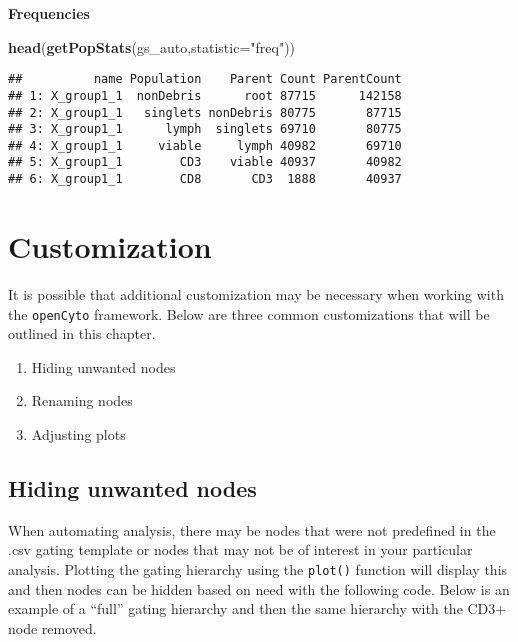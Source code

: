 \documentclass[]{book}
\newenvironment{Shaded}{\begin{snugshade}}{\end{snugshade}}
\newcommand{\DataTypeTok}[1]{\textcolor[rgb]{0.13,0.29,0.53}{#1}}
\newcommand{\KeywordTok}[1]{\textcolor[rgb]{0.13,0.29,0.53}{\textbf{#1}}}
\newcommand{\NormalTok}[1]{#1}
\newcommand{\StringTok}[1]{\textcolor[rgb]{0.31,0.60,0.02}{#1}}
\providecommand{\tightlist}{%
  \setlength{\itemsep}{0pt}\setlength{\parskip}{0pt}}
\begin{document}
\textbf{Frequencies}

\begin{Shaded}
\begin{Highlighting}[]
\KeywordTok{head}\NormalTok{(}\KeywordTok{getPopStats}\NormalTok{(gs_auto,}\DataTypeTok{statistic=}\StringTok{"freq"}\NormalTok{))}
\end{Highlighting}
\end{Shaded}

\begin{verbatim}
##          name Population    Parent Count ParentCount
## 1: X_group1_1  nonDebris      root 87715      142158
## 2: X_group1_1   singlets nonDebris 80775       87715
## 3: X_group1_1      lymph  singlets 69710       80775
## 4: X_group1_1     viable     lymph 40982       69710
## 5: X_group1_1        CD3    viable 40937       40982
## 6: X_group1_1        CD8       CD3  1888       40937
\end{verbatim}

\hypertarget{customization}{%
\chapter{Customization}\label{customization}}

It is possible that additional customization may be necessary when working with the \texttt{openCyto} framework. Below are three common customizations that will be outlined in this chapter.

\begin{enumerate}
\def\labelenumi{\arabic{enumi}.}
\tightlist
\item
  Hiding unwanted nodes
\item
  Renaming nodes
\item
  Adjusting plots
\end{enumerate}

\hypertarget{hiding-unwanted-nodes}{%
\section{Hiding unwanted nodes}\label{hiding-unwanted-nodes}}

When automating analysis, there may be nodes that were not predefined in the .csv gating template or nodes that may not be of interest in your particular analysis. Plotting the gating hierarchy using the \texttt{plot()} function will display this and then nodes can be hidden based on need with the following code. Below is an example of a ``full'' gating hierarchy and then the same hierarchy with the CD3+ node removed.
\end{document}
